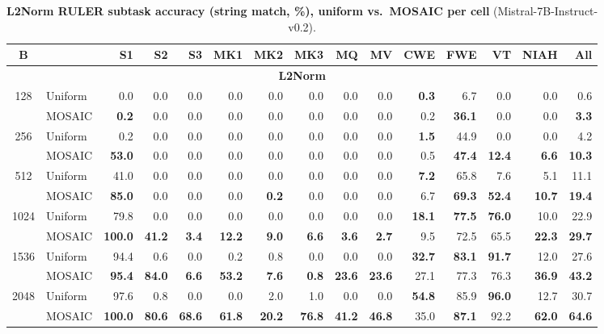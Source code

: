 \begin{table}[tp]
  \centering
  \scriptsize
  \setlength{\tabcolsep}{4pt}
  \renewcommand{\arraystretch}{0.92}
  \begin{tabular}{@{} c l rrrrrrrrrrrrr @{}}
    \toprule
    \textbf{B} & & \textbf{S1} & \textbf{S2} & \textbf{S3} & \textbf{MK1} & \textbf{MK2} & \textbf{MK3} & \textbf{MQ} & \textbf{MV} & \textbf{CWE} & \textbf{FWE} & \textbf{VT} & \textbf{NIAH} & \textbf{All} \\
    \midrule
    \multicolumn{15}{c}{\textbf{L2Norm}} \\
    \midrule
    \multirow{2}{*}{128} & Uniform & 0.0 & 0.0 & 0.0 & 0.0 & 0.0 & 0.0 & 0.0 & 0.0 & \textbf{0.3} & 6.7 & 0.0 & 0.0 & 0.6 \\
     & MOSAIC & \textbf{0.2} & 0.0 & 0.0 & 0.0 & 0.0 & 0.0 & 0.0 & 0.0 & 0.2 & \textbf{36.1} & 0.0 & 0.0 & \textbf{3.3} \\
    \cmidrule(l){1-15}
    \multirow{2}{*}{256} & Uniform & 0.2 & 0.0 & 0.0 & 0.0 & 0.0 & 0.0 & 0.0 & 0.0 & \textbf{1.5} & 44.9 & 0.0 & 0.0 & 4.2 \\
     & MOSAIC & \textbf{53.0} & 0.0 & 0.0 & 0.0 & 0.0 & 0.0 & 0.0 & 0.0 & 0.5 & \textbf{47.4} & \textbf{12.4} & \textbf{6.6} & \textbf{10.3} \\
    \cmidrule(l){1-15}
    \multirow{2}{*}{512} & Uniform & 41.0 & 0.0 & 0.0 & 0.0 & 0.0 & 0.0 & 0.0 & 0.0 & \textbf{7.2} & 65.8 & 7.6 & 5.1 & 11.1 \\
     & MOSAIC & \textbf{85.0} & 0.0 & 0.0 & 0.0 & \textbf{0.2} & 0.0 & 0.0 & 0.0 & 6.7 & \textbf{69.3} & \textbf{52.4} & \textbf{10.7} & \textbf{19.4} \\
    \cmidrule(l){1-15}
    \multirow{2}{*}{1024} & Uniform & 79.8 & 0.0 & 0.0 & 0.0 & 0.0 & 0.0 & 0.0 & 0.0 & \textbf{18.1} & \textbf{77.5} & \textbf{76.0} & 10.0 & 22.9 \\
     & MOSAIC & \textbf{100.0} & \textbf{41.2} & \textbf{3.4} & \textbf{12.2} & \textbf{9.0} & \textbf{6.6} & \textbf{3.6} & \textbf{2.7} & 9.5 & 72.5 & 65.5 & \textbf{22.3} & \textbf{29.7} \\
    \cmidrule(l){1-15}
    \multirow{2}{*}{1536} & Uniform & 94.4 & 0.6 & 0.0 & 0.2 & 0.8 & 0.0 & 0.0 & 0.0 & \textbf{32.7} & \textbf{83.1} & \textbf{91.7} & 12.0 & 27.6 \\
     & MOSAIC & \textbf{95.4} & \textbf{84.0} & \textbf{6.6} & \textbf{53.2} & \textbf{7.6} & \textbf{0.8} & \textbf{23.6} & \textbf{23.6} & 27.1 & 77.3 & 76.3 & \textbf{36.9} & \textbf{43.2} \\
    \cmidrule(l){1-15}
    \multirow{2}{*}{2048} & Uniform & 97.6 & 0.8 & 0.0 & 0.0 & 2.0 & 1.0 & 0.0 & 0.0 & \textbf{54.8} & 85.9 & \textbf{96.0} & 12.7 & 30.7 \\
     & MOSAIC & \textbf{100.0} & \textbf{80.6} & \textbf{68.6} & \textbf{61.8} & \textbf{20.2} & \textbf{76.8} & \textbf{41.2} & \textbf{46.8} & 35.0 & \textbf{87.1} & 92.2 & \textbf{62.0} & \textbf{64.6} \\
    \bottomrule
  \end{tabular}
  \caption{\textbf{L2Norm RULER subtask accuracy (string match, \%), uniform vs.\ MOSAIC per cell} (Mistral-7B-Instruct-v0.2).}
  \label{tab:app-ruler-mistral}
\end{table}

